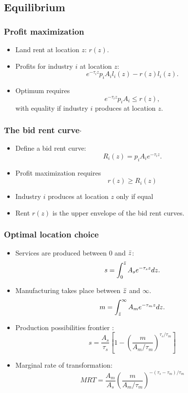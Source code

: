 \documentclass[compress,mathserif]{beamer}
\newcounter{perc}
\newcounter{percek}
\renewcommand{\time}[1]{\addtocounter{percek}{#1}}
\begin{document}
\subsection{Equilibrium}

\begin{frame}\frametitle{Profit maximization}
\begin{itemize}
    \item Land rent at location $z$: $r(z)$.
    \item Profits for industry $i$ at location $z$:
    \[
    {e}^{-\tau_i z} p_i A_i l_i(z) - r(z)l_i(z).
    \]
    \item Optimum requires
    \[
    {e}^{-\tau_i z} p_i A_i \le r(z),
    \]
    with equality if industry $i$ produces at location $z$.
\end{itemize}
\end{frame}
\time{1}

\begin{frame}\frametitle{The bid rent curve$\cdot$}
\begin{itemize}
    \item Define a bid rent curve:
    \[
    R_i(z) = p_iA_i{e}^{-\tau_i z}.
    \]
    \item Profit maximization requires
    \[
    r(z)\ge R_i(z)
    \]
    \item Industry $i$ produces at location $z$ only if equal \hyperlink{bid-rent-2-exp}{}
    \item Rent $r(z)$ is the upper envelope of the bid rent curves.
\end{itemize}
\end{frame}

\begin{frame}\frametitle{Optimal location choice}
\begin{itemize}
\item Services are produced between $0$ and $\Bar z$:
\[
s = \int_0^{\Bar z}A_se^{-\tau_s z}dz.
\]
\item Manufacturing takes place between $\Bar z$ and $\infty$.
\[
m = \int_{\Bar z}^\infty A_me^{-\tau_m z}dz.
\]
\item Production possibilities frontier \hyperlink{PPF-location}{}:
\[
s = \frac{A_s}{\tau_s}\left[1-\left(\frac{m}{A_m/\tau_m}\right)^{\tau_s/\tau_m}\right]
\]
\item Marginal rate of transformation:
\[
MRT = \frac{A_m}{A_s}\left(\frac{m}{A_m/\tau_m}\right)^{-(\tau_s-\tau_m)/\tau_m}
\]
\end{itemize}
\end{frame}
\end{document}
